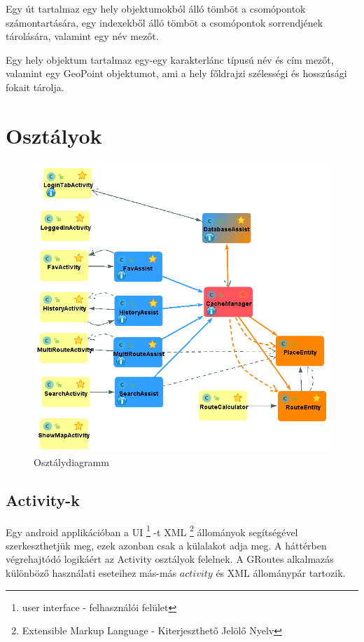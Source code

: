 Egy út tartalmaz egy hely objektumokból álló tömböt a csomópontok számontartására, egy indexekből álló tömböt a csomópontok sorrendjének tárolására, valamint egy név mezőt.

Egy hely objektum tartalmaz egy-egy karakterlánc típusú név és cím mezőt, valamint egy GeoPoint objektumot, ami a hely főldrajzi szélességi és hosszúsági fokait tárolja.
 

\section{Osztályok}\label{sec:ALAP:adatelem}

\begin{figure}
	\centering
	\setlength{\abovecaptionskip}{-10pt}
	\setlength{\belowcaptionskip}{0pt}
	\includegraphics[width=1\textwidth]{images/class_diagram}
	\caption{Osztálydiagramm\label{fig:ALAP:sm2}}
\end{figure}

\subsection{Activity-k}\label{sec:ALAP:adatelem}

Egy android applikációban a UI%
\footnote{ %
	user interface - felhasználói felület
}  %
-t XML%
\footnote{ %
	Extensible Markup Language - Kiterjeszthető Jelölő Nyelv
}  %
állományok segítségével szerkeszthetjük meg, ezek azonban csak a külalakot adja meg. A háttérben végrehajtódó logikáért az Activity osztályok felelnek. A GRoutes alkalmazás különböző használati eseteihez más-más \(activity\) és XML állománypár tartozik.

